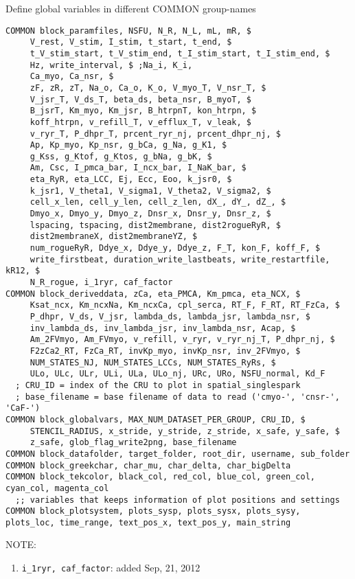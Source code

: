 Define global variables in different COMMON group-names
\begin{verbatim}
COMMON block_paramfiles, NSFU, N_R, N_L, mL, mR, $
     V_rest, V_stim, I_stim, t_start, t_end, $
     t_V_stim_start, t_V_stim_end, t_I_stim_start, t_I_stim_end, $
     Hz, write_interval, $ ;Na_i, K_i,
     Ca_myo, Ca_nsr, $
     zF, zR, zT, Na_o, Ca_o, K_o, V_myo_T, V_nsr_T, $
     V_jsr_T, V_ds_T, beta_ds, beta_nsr, B_myoT, $
     B_jsrT, Km_myo, Km_jsr, B_htrpnT, kon_htrpn, $
     koff_htrpn, v_refill_T, v_efflux_T, v_leak, $
     v_ryr_T, P_dhpr_T, prcent_ryr_nj, prcent_dhpr_nj, $
     Ap, Kp_myo, Kp_nsr, g_bCa, g_Na, g_K1, $
     g_Kss, g_Ktof, g_Ktos, g_bNa, g_bK, $
     Am, Csc, I_pmca_bar, I_ncx_bar, I_NaK_bar, $
     eta_RyR, eta_LCC, Ej, Ecc, Eoo, k_jsr0, $
     k_jsr1, V_theta1, V_sigma1, V_theta2, V_sigma2, $
     cell_x_len, cell_y_len, cell_z_len, dX_, dY_, dZ_, $
     Dmyo_x, Dmyo_y, Dmyo_z, Dnsr_x, Dnsr_y, Dnsr_z, $
     lspacing, tspacing, dist2membrane, dist2rogueRyR, $
     dist2membraneX, dist2membraneYZ, $  
     num_rogueRyR, Ddye_x, Ddye_y, Ddye_z, F_T, kon_F, koff_F, $
     write_firstbeat, duration_write_lastbeats, write_restartfile, kR12, $
     N_R_rogue, i_1ryr, caf_factor
COMMON block_deriveddata, zCa, eta_PMCA, Km_pmca, eta_NCX, $
     Ksat_ncx, Km_ncxNa, Km_ncxCa, cpl_serca, RT_F, F_RT, RT_FzCa, $
     P_dhpr, V_ds, V_jsr, lambda_ds, lambda_jsr, lambda_nsr, $
     inv_lambda_ds, inv_lambda_jsr, inv_lambda_nsr, Acap, $
     Am_2FVmyo, Am_FVmyo, v_refill, v_ryr, v_ryr_nj_T, P_dhpr_nj, $
     F2zCa2_RT, FzCa_RT, invKp_myo, invKp_nsr, inv_2FVmyo, $
     NUM_STATES_NJ, NUM_STATES_LCCs, NUM_STATES_RyRs, $
     ULo, ULc, ULr, ULi, ULa, ULo_nj, URc, URo, NSFU_normal, Kd_F
  ; CRU_ID = index of the CRU to plot in spatial_singlespark
  ; base_filename = base filename of data to read ('cmyo-', 'cnsr-', 'CaF-')
COMMON block_globalvars, MAX_NUM_DATASET_PER_GROUP, CRU_ID, $
     STENCIL_RADIUS, x_stride, y_stride, z_stride, x_safe, y_safe, $
     z_safe, glob_flag_write2png, base_filename
COMMON block_datafolder, target_folder, root_dir, username, sub_folder
COMMON block_greekchar, char_mu, char_delta, char_bigDelta
COMMON block_tekcolor, black_col, red_col, blue_col, green_col, cyan_col, magenta_col
  ;; variables that keeps information of plot positions and settings
COMMON block_plotsystem, plots_sysp, plots_sysx, plots_sysy, plots_loc, time_range, text_pos_x, text_pos_y, main_string
\end{verbatim}
NOTE:
\begin{enumerate}
  \item \verb!i_1ryr, caf_factor!: added Sep, 21, 2012
  
\end{enumerate}

